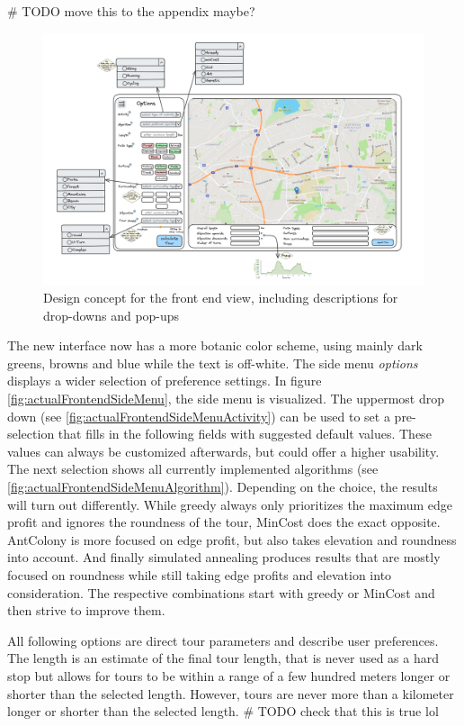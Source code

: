 \# TODO move this to the appendix maybe?
\begin{figure}[H]
	\includegraphics[width=0.9\linewidth]{bilder/Concept new Frontend design.png}
	\caption{Design concept for the front end view, including descriptions for drop-downs and pop-ups}
	\label{fig:frontendConcept}
\end{figure}



The new interface now has a more botanic color scheme, using mainly dark greens, browns and blue while the text is off-white.
The side menu \textit{options} displays a wider selection of preference settings.
In figure \ref{fig:actualFrontendSideMenu}, the side menu is visualized. 
The uppermost drop down (see \ref{fig:actualFrontendSideMenuActivity}) can be used to set a pre-selection that fills in the following fields with suggested default values. 
These values can always be customized afterwards, but could offer a higher usability.
The next selection shows all currently implemented algorithms (see \ref{fig:actualFrontendSideMenuAlgorithm}).
Depending on the choice, the results will turn out differently.
While greedy always only prioritizes the maximum edge profit and ignores the roundness of the tour, MinCost does the exact opposite.
AntColony is more focused on edge profit, but also takes elevation and roundness into account.
And finally simulated annealing produces results that are mostly focused on roundness while still taking edge profits and elevation into consideration. 
The respective combinations start with greedy or MinCost and then strive to improve them. 

All following options are direct tour parameters and describe user preferences.
The length is an estimate of the final tour length, that is never used as a hard stop but allows for tours to be within a range of a few hundred meters longer or shorter than the selected length.
However, tours are never more than a kilometer longer or shorter than the selected length.
\# TODO check that this is true lol


